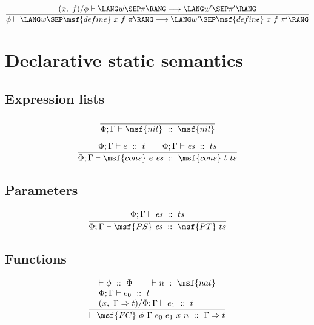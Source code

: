 \documentclass{article}
\begin{document}
\begin{gather}
  \frac{ (x, \ f) / \phi \vdash \LANG w \SEP \pi \RANG \longrightarrow
    \LANG w' \SEP \pi' \RANG }{ \phi \vdash \LANG w \SEP \msf{define}
    \ x \ f \ \pi \RANG \longrightarrow \LANG w' \SEP \msf{define} \ x
    \ f \ \pi' \RANG }
\end{gather}




\section{Declarative static semantics }




\subsection{Expression lists}

\begin{gather}
\frac{ }
 { \Phi; \Gamma \vdash \msf{nil} \ :: \ \msf{nil} }
\end{gather}


\begin{gather}
\frac{ \Phi; \Gamma \vdash e \ :: \ t \qquad \Phi; \Gamma \vdash
  \mbox{\it es} \ :: \ ts } { \Phi; \Gamma \vdash \msf{cons} \ e
  \ \mbox{\it es} \ :: \ \msf{cons} \ t \ ts }
\end{gather}




\subsection{Parameters}


\begin{gather}
  \frac{\begin{array}{lll}
    \Phi; \Gamma \vdash \mbox{\it es} \ :: \ ts 
    \end{array}
  }{ \Phi; \Gamma \vdash \msf{PS} \ \mbox{\it es} \ :: \ \msf{PT} \ ts
  }
\end{gather}




\subsection{Functions}


\begin{gather}
  \frac{
\begin{array}{lll}  
  \vdash \phi \ :: \ \Phi \qquad \vdash n \ : \ \msf{nat} \\
  \Phi; \Gamma \vdash e_0 \ :: \ t \\
  (x, \ \Gamma \Rightarrow t) / \Phi; \Gamma \vdash e_1 \ :: \ t \\  
\end{array}  
  }{ \vdash \msf{FC} \ \phi \ \Gamma \ e_0 \ e_1 \ x \ n \ :: \ \Gamma
    \Rightarrow t}
\end{gather}
\end{document}
